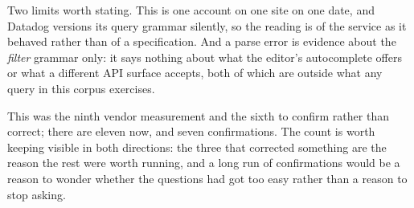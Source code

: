 \begin{remark}
Two limits worth stating. This is one account on one site on one date, and Datadog
versions its query grammar silently, so the reading is of the service as it behaved
rather than of a specification. And a parse error is evidence about the \emph{filter}
grammar only: it says nothing about what the editor's autocomplete offers or what a
different API surface accepts, both of which are outside what any query in this corpus
exercises.

This was the ninth vendor measurement and the sixth to confirm rather than correct;
there are eleven now, and seven confirmations. The count is worth keeping visible in
both directions: the three that corrected something are the reason the rest were worth
running, and a long run of confirmations would be a reason to wonder whether the
questions had got too easy rather than a reason to stop asking.
\end{remark}
